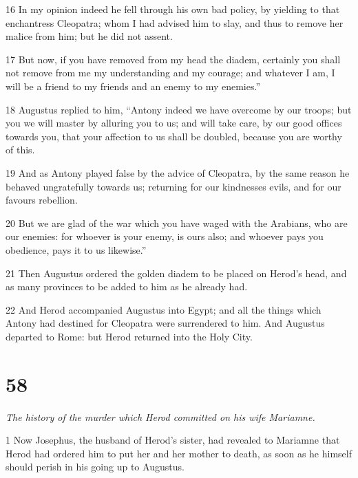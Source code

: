 \par 16 In my opinion indeed he fell through his own bad policy, by yielding to that enchantress Cleopatra; whom I had advised him to slay, and thus to remove her malice from him; but he did not assent. 

\par 17 But now, if you have removed from my head the diadem, certainly you shall not remove from me my understanding and my courage; and whatever I am, I will be a friend to my friends and an enemy to my enemies.”

\par 18 Augustus replied to him, “Antony indeed we have overcome by our troops; but you we will master by alluring you to us; and will take care, by our good offices towards you, that your affection to us shall be doubled, because you are worthy of this. 

\par 19 And as Antony played false by the advice of Cleopatra, by the same reason he behaved ungratefully towards us; returning for our kindnesses evils, and for our favours rebellion. 

\par 20 But we are glad of the war which you have waged with the Arabians, who are our enemies: for whoever is your enemy, is ours also; and whoever pays you obedience, pays it to us likewise.” 

\par 21 Then Augustus ordered the golden diadem to be placed on Herod’s head, and as many provinces to be added to him as he already had. 

\par 22 And Herod accompanied Augustus into Egypt; and all the things which Antony had destined for Cleopatra were surrendered to him. And Augustus departed to Rome: but Herod returned into the Holy City.

\chapter{58}

\par \textit{The history of the murder which Herod committed on his wife Mariamne.}

\par 1 Now Josephus, the husband of Herod’s sister, had revealed to Mariamne that Herod had ordered him to put her and her mother to death, as soon as he himself should perish in his going up to Augustus. 

